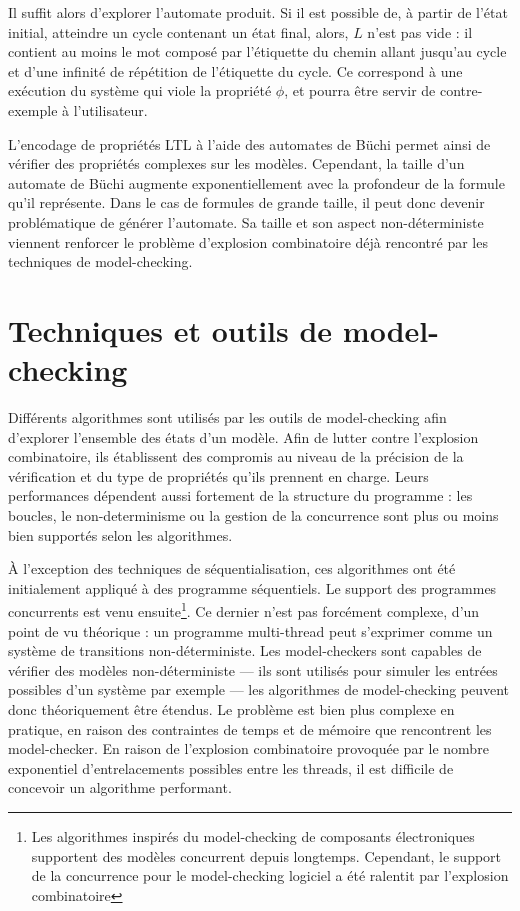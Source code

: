 Il suffit alors d'explorer l'automate produit. Si il est possible de, à partir
de l'état initial, atteindre un cycle contenant un état final, alors, \(L\)
n'est pas vide : il contient au moins le mot composé par l'étiquette du chemin
allant jusqu'au cycle et d'une infinité de répétition de l'étiquette du cycle.
Ce correspond à une exécution du système qui viole la propriété \(\phi\), et
pourra être servir de contre-exemple à l'utilisateur.

L'encodage de propriétés LTL à l'aide des automates de Büchi permet ainsi de
vérifier des propriétés complexes sur les modèles. Cependant, la taille d'un
automate de Büchi augmente exponentiellement avec la profondeur de la formule
qu'il représente. Dans le cas de formules de grande taille, il peut donc devenir
problématique de générer l'automate. Sa taille et son aspect non-déterministe
viennent renforcer le problème d'explosion combinatoire déjà rencontré par les
techniques de model-checking.

\section{Techniques et outils de model-checking}
\label{sec:techniques-et-outils-de-model-checking}

Différents algorithmes sont utilisés par les outils de model-checking
afin d'explorer l'ensemble des états d'un modèle. Afin de lutter contre
l'explosion combinatoire, ils établissent des compromis au niveau de la
précision de la vérification et du type de propriétés qu'ils prennent en charge.
Leurs performances dépendent aussi fortement de la
structure du programme : les boucles, le non-determinisme ou la gestion
de la concurrence sont plus ou moins bien supportés selon
les algorithmes.

À l'exception des techniques de séquentialisation, ces algorithmes ont été
initialement appliqué à des programme séquentiels. Le support des programmes
concurrents est venu ensuite\footnote{Les algorithmes inspirés du model-checking
  de composants électroniques supportent des modèles concurrent depuis
  longtemps. Cependant, le support de la concurrence pour le model-checking
  logiciel a été ralentit par l'explosion combinatoire}.
Ce dernier n'est pas forcément complexe, d'un point de vu théorique : un
programme multi-thread peut s'exprimer comme un système de transitions
non-déterministe. Les model-checkers sont capables de vérifier des modèles
non-déterministe --- ils sont utilisés pour simuler les entrées possibles d'un
système par exemple --- les algorithmes de model-checking peuvent donc
théoriquement être étendus.
Le problème est bien plus complexe en pratique, en raison des contraintes de
temps et de mémoire que rencontrent les model-checker. En raison de l'explosion
combinatoire provoquée par le nombre exponentiel d'entrelacements possibles
entre les threads, il est difficile de concevoir un algorithme performant.


